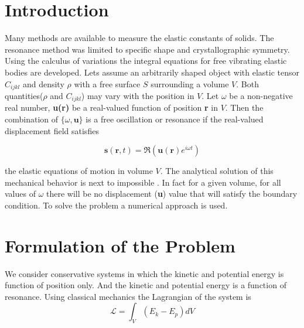 \begin{doublespacing}

\section{Introduction}
Many methods are available to measure the elastic constants of solids. The resonance method was limited to specific shape and crystallographic symmetry. Using the calculus of variations the integral equations for free vibrating elastic bodies are developed. Lets assume  an arbitrarily shaped object
with elastic tensor $C_{ijkl}$ and density $\rho$ with a free surface $S$ surrounding a volume $V$. Both quantities($\rho$ and $C_{ijkl}$) may vary with the position in $V$. Let $\omega$ be a non-negative real number, \textbf{u(r)} be a real-valued function of position \textbf{r} in $V$. Then the combination of $\{\omega,\textbf{u}\}$ is a free oscillation or resonance if the real-valued displacement field satisfies



\begin{equation}
\textbf{s}(\textbf{r},t) = \Re(\textbf{u}(\textbf{r})e^{i\omega t})
\end{equation}


the elastic equations of motion in volume $V$. The analytical solution of this mechanical behavior is next to impossible \cite{zadler2004resonant}. In fact for a given volume, for all values of $\omega$ there will be no displacement (\textbf{u}) value that will satisfy the boundary condition. To solve the problem a numerical approach is used. 
\section{Formulation of the Problem}
We consider conservative systems in which the kinetic and potential energy is function of position only. And the kinetic and potential energy is a function of resonance.
 Using classical mechanics the Lagrangian of the system is 
\begin{equation}
\label{eq_lagrangian}
\mathcal{L}=\int_V (E_k - E_p)dV
\end{equation}



\end{doublespacing}
